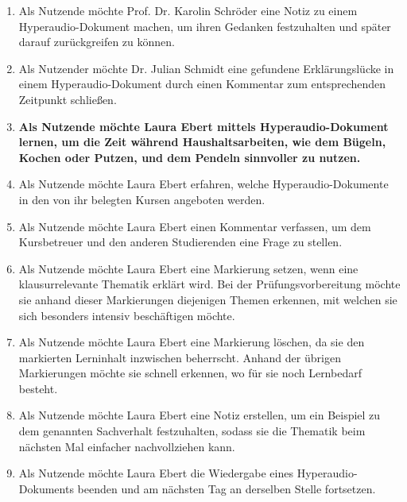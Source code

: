\begin{enumerate}
\item Als Nutzende möchte Prof. Dr. Karolin Schröder eine Notiz zu einem Hyperaudio-Dokument machen, um ihren Gedanken festzuhalten und später darauf zurückgreifen zu können.

\item Als Nutzender möchte Dr. Julian Schmidt eine gefundene Erklärungslücke in einem Hyperaudio-Dokument durch einen Kommentar zum entsprechenden Zeitpunkt schließen.


\item \textbf{Als Nutzende möchte Laura Ebert mittels Hyperaudio-Dokument lernen, um die Zeit während Haushaltsarbeiten, wie dem Bügeln, Kochen oder Putzen, und dem Pendeln sinnvoller zu nutzen.}

\item Als Nutzende möchte Laura Ebert erfahren, welche Hyperaudio-Dokumente in den von ihr belegten Kursen angeboten werden.

\item Als Nutzende möchte Laura Ebert einen Kommentar verfassen, um dem Kursbetreuer und den anderen Studierenden eine Frage zu stellen.

\item Als Nutzende möchte Laura Ebert eine Markierung setzen, wenn eine klausurrelevante Thematik erklärt wird. Bei der Prüfungsvorbereitung möchte sie anhand dieser Markierungen diejenigen Themen erkennen, mit welchen sie sich besonders intensiv beschäftigen möchte.

\item Als Nutzende möchte Laura Ebert eine Markierung löschen, da sie den markierten Lerninhalt inzwischen beherrscht. Anhand der übrigen Markierungen möchte sie schnell erkennen, wo für sie noch Lernbedarf besteht.

\item Als Nutzende möchte Laura Ebert eine Notiz erstellen, um ein Beispiel zu dem genannten Sachverhalt festzuhalten, sodass sie die Thematik beim nächsten Mal einfacher nachvollziehen kann.

\item Als Nutzende möchte Laura Ebert die Wiedergabe eines Hyperaudio-Dokuments beenden und am nächsten Tag an derselben Stelle fortsetzen.


\end{enumerate}
